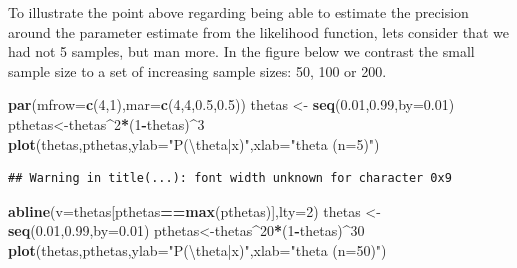 \documentclass[
]{book}
\newenvironment{Shaded}{\begin{snugshade}}{\end{snugshade}}
\newcommand{\CharTok}[1]{\textcolor[rgb]{0.31,0.60,0.02}{#1}}
\newcommand{\DataTypeTok}[1]{\textcolor[rgb]{0.13,0.29,0.53}{#1}}
\newcommand{\DecValTok}[1]{\textcolor[rgb]{0.00,0.00,0.81}{#1}}
\newcommand{\FloatTok}[1]{\textcolor[rgb]{0.00,0.00,0.81}{#1}}
\newcommand{\KeywordTok}[1]{\textcolor[rgb]{0.13,0.29,0.53}{\textbf{#1}}}
\newcommand{\NormalTok}[1]{#1}
\newcommand{\OperatorTok}[1]{\textcolor[rgb]{0.81,0.36,0.00}{\textbf{#1}}}
\newcommand{\StringTok}[1]{\textcolor[rgb]{0.31,0.60,0.02}{#1}}
\begin{document}
To illustrate the point above regarding being able to estimate the precision around the parameter estimate from the likelihood function, lets consider that we had not 5 samples, but man more. In the figure below we contrast the small sample size to a set of increasing sample sizes: 50, 100 or 200.

\begin{Shaded}
\begin{Highlighting}[]
\KeywordTok{par}\NormalTok{(}\DataTypeTok{mfrow=}\KeywordTok{c}\NormalTok{(}\DecValTok{4}\NormalTok{,}\DecValTok{1}\NormalTok{),}\DataTypeTok{mar=}\KeywordTok{c}\NormalTok{(}\DecValTok{4}\NormalTok{,}\DecValTok{4}\NormalTok{,}\FloatTok{0.5}\NormalTok{,}\FloatTok{0.5}\NormalTok{))}
\NormalTok{thetas <-}\StringTok{ }\KeywordTok{seq}\NormalTok{(}\FloatTok{0.01}\NormalTok{,}\FloatTok{0.99}\NormalTok{,}\DataTypeTok{by=}\FloatTok{0.01}\NormalTok{)}
\NormalTok{pthetas<-thetas}\OperatorTok{^}\DecValTok{2}\OperatorTok{*}\NormalTok{(}\DecValTok{1}\OperatorTok{-}\NormalTok{thetas)}\OperatorTok{^}\DecValTok{3}
\KeywordTok{plot}\NormalTok{(thetas,pthetas,}\DataTypeTok{ylab=}\StringTok{"P(}\CharTok{\textbackslash{}t}\StringTok{heta|x)"}\NormalTok{,}\DataTypeTok{xlab=}\StringTok{"theta (n=5)"}\NormalTok{)}
\end{Highlighting}
\end{Shaded}

\begin{verbatim}
## Warning in title(...): font width unknown for character 0x9
\end{verbatim}

\begin{Shaded}
\begin{Highlighting}[]
\KeywordTok{abline}\NormalTok{(}\DataTypeTok{v=}\NormalTok{thetas[pthetas}\OperatorTok{==}\KeywordTok{max}\NormalTok{(pthetas)],}\DataTypeTok{lty=}\DecValTok{2}\NormalTok{)}
\NormalTok{thetas <-}\StringTok{ }\KeywordTok{seq}\NormalTok{(}\FloatTok{0.01}\NormalTok{,}\FloatTok{0.99}\NormalTok{,}\DataTypeTok{by=}\FloatTok{0.01}\NormalTok{)}
\NormalTok{pthetas<-thetas}\OperatorTok{^}\DecValTok{20}\OperatorTok{*}\NormalTok{(}\DecValTok{1}\OperatorTok{-}\NormalTok{thetas)}\OperatorTok{^}\DecValTok{30}
\KeywordTok{plot}\NormalTok{(thetas,pthetas,}\DataTypeTok{ylab=}\StringTok{"P(}\CharTok{\textbackslash{}t}\StringTok{heta|x)"}\NormalTok{,}\DataTypeTok{xlab=}\StringTok{"theta  (n=50)"}\NormalTok{)}
\end{Highlighting}
\end{Shaded}
\end{document}
